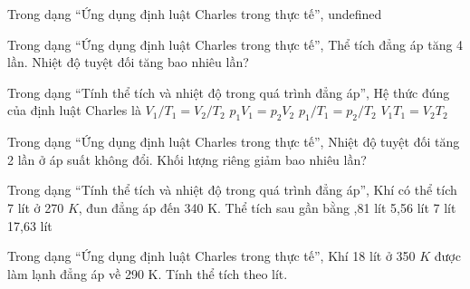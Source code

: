 \begin{bt}
Trong dạng “Ứng dụng định luật Charles trong thực tế”, undefined
\end{bt}

\begin{ex}
Trong dạng “Ứng dụng định luật Charles trong thực tế”, Thể tích đẳng áp tăng 4 lần. Nhiệt độ tuyệt đối tăng bao nhiêu lần?
\end{ex}

\begin{ex}
Trong dạng “Tính thể tích và nhiệt độ trong quá trình đẳng áp”, Hệ thức đúng của định luật Charles là
\choice
{\True $V_1/T_1=V_2/T_2$}
{$p_1V_1=p_2V_2$}
{$p_1/T_1=p_2/T_2$}
{$V_1T_1=V_2T_2$}
\end{ex}

\begin{ex}
Trong dạng “Ứng dụng định luật Charles trong thực tế”, Nhiệt độ tuyệt đối tăng 2 lần ở áp suất không đổi. Khối lượng riêng giảm bao nhiêu lần?
\end{ex}

\begin{ex}
Trong dạng “Tính thể tích và nhiệt độ trong quá trình đẳng áp”, Khí có thể tích 7 lít ở 270 $K$, đun đẳng áp đến 340 K. Thể tích sau gần bằng
\choice
{,81 lít}
{5,56 lít}
{7 lít}
{17,63 lít}
\end{ex}

\begin{ex}
Trong dạng “Ứng dụng định luật Charles trong thực tế”, Khí 18 lít ở 350 $K$ được làm lạnh đẳng áp về 290 K. Tính thể tích theo lít.
\end{ex}

